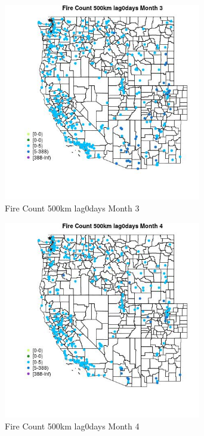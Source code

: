 \begin{figure} 
\centering  
\includegraphics[width=0.77\textwidth]{Code_Outputs/Report_ML_input_PM25_Step4_part_e_de_duplicated_aves_compiled_2019-05-18wNAs_MapObsMo3Fire_Count_500km_lag0days.jpg} 
\caption{\label{fig:Report_ML_input_PM25_Step4_part_e_de_duplicated_aves_compiled_2019-05-18wNAsMapObsMo3Fire_Count_500km_lag0days}Fire Count 500km lag0days Month 3} 
\end{figure} 
 

\begin{figure} 
\centering  
\includegraphics[width=0.77\textwidth]{Code_Outputs/Report_ML_input_PM25_Step4_part_e_de_duplicated_aves_compiled_2019-05-18wNAs_MapObsMo4Fire_Count_500km_lag0days.jpg} 
\caption{\label{fig:Report_ML_input_PM25_Step4_part_e_de_duplicated_aves_compiled_2019-05-18wNAsMapObsMo4Fire_Count_500km_lag0days}Fire Count 500km lag0days Month 4} 
\end{figure} 
 

